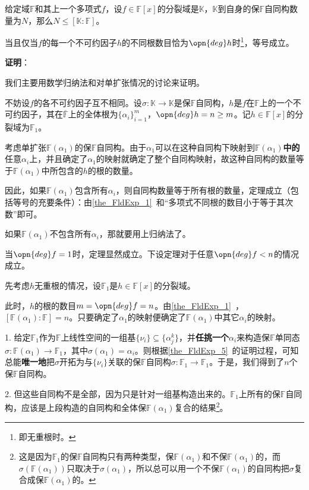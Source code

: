 \begin{theorem}{}\label{the_SpltFd_1}
给定域$\mathbb{F}$和其上一个多项式$f$，设$f\in\mathbb{F}[x]$的分裂域是$\mathbb{K}$，$\mathbb{K}$到自身的保$\mathbb{F}$自同构数量为$N$，那么$N\leq[\mathbb{K}:\mathbb{F}]$。

当且仅当$f$的每一个不可约因子$h$的不同根数目恰为$\opn{deg}h$时\footnote{即无重根时。}，等号成立。
\end{theorem}

\textbf{证明}：

我们主要用数学归纳法和对单扩张情况的讨论来证明。

不妨设$f$的各不可约因子互不相同。设$\sigma:\mathbb{K}\to\mathbb{K}$是保$\mathbb{F}$自同构，$h$是$f$在$\mathbb{F}$上的一个不可约因子，其在$\overline{\mathbb{F}}$上的全体根为$\{\alpha_i\}_{i=1}^m$，$\opn{deg}h=n\geq m$。记$h\in\mathbb{F}[x]$的分裂域为$\mathbb{F}_1$。

考虑单扩张$\mathbb{F}(\alpha_1)$的保$\mathbb{F}$自同构。由于$\alpha_1$可以在这种自同构下映射到$\mathbb{F}(\alpha_1)$\textbf{中的}任意$\alpha_i$上，并且确定了$\alpha_1$的映射就确定了整个自同构映射，故这种自同构的数量等于$\mathbb{F}(\alpha_1)$中所包含的$h$的根的数量。

因此，如果$\mathbb{F}(\alpha_1)$包含所有$\alpha_i$，则自同构数量等于所有根的数量，定理成立（包括等号的充要条件）：由\autoref{the_FldExp_1}~和“多项式不同根的数目小于等于其次数”即可。

如果$\mathbb{F}(\alpha_1)$不包含所有$\alpha_i$，那就要用上归纳法了。

当$\opn{deg}f=1$时，定理显然成立。下设定理对于任意$\opn{deg}f<n$的情况成立。

先考虑$h$无重根的情况，设$\mathbb{F}_1$是$h\in\mathbb{F}[x]$的分裂域。

此时，$h$的根的数目$m=\opn{deg}f=n$。由\autoref{the_FldExp_1}~，$[\mathbb{F}(\alpha_1):
\mathbb{F}]=n$。只要确定了$\alpha_1$的映射便确定了$\mathbb{F}(\alpha_1)$中其它$\alpha_i$的映射。

1. 给定$\mathbb{F}_1$作为$\mathbb{F}$上线性空间的一组基$\{\nu_i\}\subseteq\{\alpha_j^k\}$，并\textbf{任挑一个}$\alpha_i$来构造保$\mathbb{F}$单同态$\sigma: \mathbb{F}(\alpha_1)\to\mathbb{F}_1$，其中$\sigma(\alpha_1)=\alpha_i$。则根据\autoref{the_FldExp_5}~的证明过程，可知总能\textbf{唯一地}把$\sigma$开拓为与$\{\nu_i\}$关联的保$\mathbb{F}$自同构$\sigma: \mathbb{F}_1\to\mathbb{F}_1$。于是，我们得到了$n$个保$\mathbb{F}$自同构。

2. 但这些自同构不是全部，因为只是针对一组基构造出来的。$\mathbb{F}_1$上所有的保$\mathbb{F}$自同构，应该是上段构造的自同构和全体保$\mathbb{F}(\alpha_1)$复合的结果\footnote{这是因为$\mathbb{F}_1$的保$\mathbb{F}$自同构只有两种类型，保$\mathbb{F}(\alpha_1)$和不保$\mathbb{F}(\alpha_1)$的，而$\sigma(\mathbb{F}(\alpha_1))$只取决于$\sigma(\alpha_1)$，所以总可以用一个不保$\mathbb{F}(\alpha_1)$的自同构把$\sigma$复合成保$\mathbb{F}(\alpha_1)$的。}。

